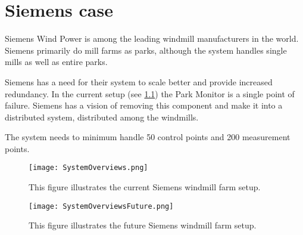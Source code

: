 \chapter{Siemens case}

Siemens Wind Power is among the leading windmill manufacturers in the world.
Siemens primarily do mill farms as parks, although the system handles single mills as well as entire parks.

Siemens has a need for their system to scale better and provide increased redundancy.
In the current setup (see \cref{fig:currentSiemensSetup}) the Park Monitor is a single point of failure.
Siemens has a vision of removing this component and make it into a distributed system, distributed among the windmills.

The system needs to minimum handle 50 control points and 200 measurement points.

\begin{figure}
	\centering
	\texttt{[image: SystemOverviews.png]} 
	\caption[Illustrates the current Siemens windmill farm setup]{
		\label{fig:currentSiemensSetup} 
		\footnotesize{%
			This figure illustrates the current Siemens windmill farm setup.
		}
	}
\end{figure}

\begin{figure}
	\centering
	\texttt{[image: SystemOverviewsFuture.png]} 
	\caption[Illustrates the future Siemens windmill farm setup]{
		\label{fig:futureSiemensSetup} 
		\footnotesize{%
			This figure illustrates the future Siemens windmill farm setup.
		}
	}
\end{figure}
